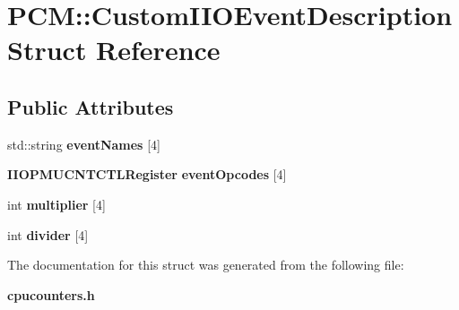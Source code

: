 \section{P\+CM\+:\+:Custom\+I\+I\+O\+Event\+Description Struct Reference}
\label{structPCM_1_1CustomIIOEventDescription}
\subsection*{Public Attributes}
\begin{DoxyCompactItemize}
\item 
\mbox{\label{structPCM_1_1CustomIIOEventDescription_af615c81f40d39e8770822313cd5fdbb6}} 
std\+::string {\bfseries event\+Names} [4]
\item 
\mbox{\label{structPCM_1_1CustomIIOEventDescription_a6bb56f124b443dfb2a46b203488cb451}} 
\textbf{ I\+I\+O\+P\+M\+U\+C\+N\+T\+C\+T\+L\+Register} {\bfseries event\+Opcodes} [4]
\item 
\mbox{\label{structPCM_1_1CustomIIOEventDescription_a7953c1b84fd3b592b1b703a646c48e21}} 
int {\bfseries multiplier} [4]
\item 
\mbox{\label{structPCM_1_1CustomIIOEventDescription_ae143fcdb7aa0f4c1cf5fb7f0767754e3}} 
int {\bfseries divider} [4]
\end{DoxyCompactItemize}


The documentation for this struct was generated from the following file\+:\begin{DoxyCompactItemize}
\item 
\textbf{ cpucounters.\+h}\end{DoxyCompactItemize}
